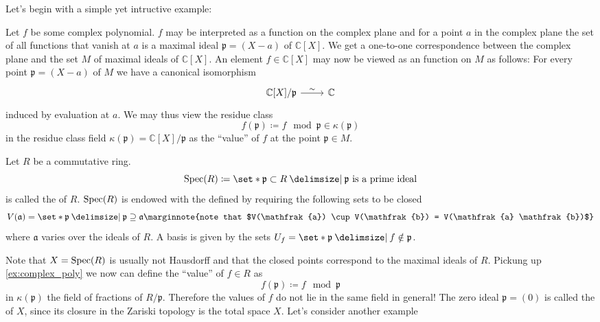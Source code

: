 Let's begin with a simple yet intructive example:
\begin{example}
	\label{ex:complex_poly}
	Let $f$ be some complex polynomial.
	$f$ may be interpreted as a function on the complex plane and for a point $a$ in the complex plane the set of all functions that vanish at $a$ is a maximal ideal $\mathfrak{p}=(X-a)$ of $\mathbb{C}[X]$.
	We get a one-to-one correspondence between the complex plane and the set $M$ of maximal ideals of $\mathbb{C}[X]$.
	An element $f \in \mathbb{C}[X]$ may now be viewed as an function on $M$ as follows:
	For every point $\mathfrak{p}=(X-a)$ of $M$ we have a canonical isomorphism
	\[
		\begin{tikzcd}
			\mathbb{C}[X]/\mathfrak{p} \rar["\sim"] & \mathbb{C}
		\end{tikzcd}
	\]
	induced by evaluation at $a$.
	We may thus view the residue class
	\[
		f(\mathfrak{p}) \coloneqq f \mod \mathfrak{p} \in \kappa(\mathfrak{p})
	\]
	in the residue class field $\kappa(\mathfrak{p}) = \mathbb{C}[X]/\mathfrak{p}$ as the \enquote{value} of $f$ at the point $\mathfrak{p} \in M$.
\end{example}

\begin{definition}[{name=[prime spectrum]}]
	Let $R$ be a commutative ring.
	\[
		\Spec(R) \coloneqq \set*{\mathfrak{p} \subset R \given \mathfrak{p} \text{ is a prime ideal} }
	\]
	is called the  of $R$.
	$\operatorname{Spec}(R)$ is endowed with the  defined by requiring the following sets to be closed
	\[
		V(\mathfrak{a}) = \set*{\mathfrak{p} \given \mathfrak{p} \supseteq \mathfrak{a}}\marginnote{note that $V(\mathfrak{a}) \cup V(\mathfrak{b}) = V(\mathfrak{a} \mathfrak{b})$}
	\]
	where $\mathfrak{a}$ varies over the ideals of $R$.
	A basis is given by the sets $U_f = \set*{\mathfrak{p} \given f \notin \mathfrak{p}}$.
\end{definition}

Note that $X= \operatorname{Spec}(R)$ is usually not Hausdorff and that the closed points correspond to the maximal ideals of $R$.
Pickung up \cref{ex:complex_poly} we now can define the \enquote{value} of $f \in R$  as
\[
	f(\mathfrak{p}) \coloneqq f \mod \mathfrak{p}
\]
in $\kappa(\mathfrak{p})$ the field of fractions of $R/\mathfrak{p}$.
Therefore the values of $f$ do not lie in the same field in general!
The zero ideal $\mathfrak{p}= (0)$ is called the  of $X$, since its closure in the Zariski topology is the total space $X$.
Let's consider another example

